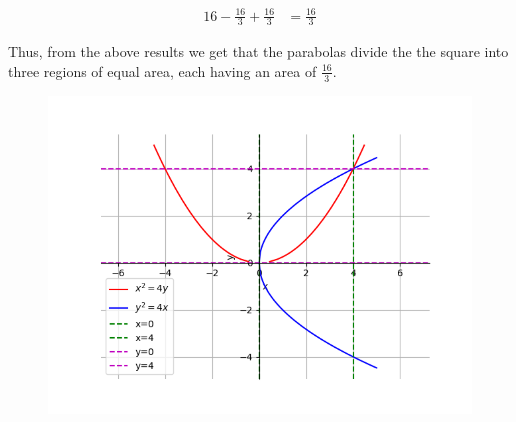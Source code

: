\documentclass[journal,12pt,onecolumn]{IEEEtran}
\theoremstyle{remark}
\begin{document}
\begin{align}
	16 - \frac{16}{3} + \frac{16}{3} &= \frac{16}{3}
\end{align}

Thus, from the above results we get that the parabolas divide the the square into three regions of equal area, each having an area of $\frac{16}{3}$.

\begin{figure}[h!]
	\centering
	\includegraphics[width=0.7\linewidth]{figs/plot.png}
\end{figure}
\end{document}
